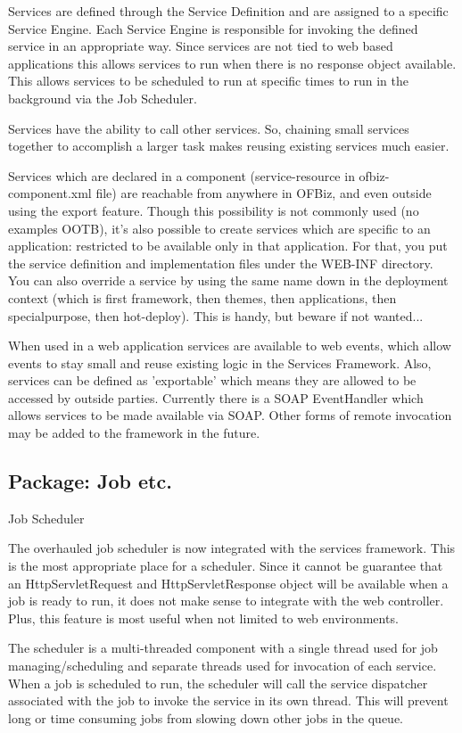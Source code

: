 \documentclass[english]{article}
\begin{document}
Services are defined through the Service Definition and are assigned to a specific Service Engine. Each Service Engine is responsible for invoking the defined service in an appropriate way. Since services are not tied to web based applications this allows services to run when there is no response object available. This allows services to be scheduled to run at specific times to run in the background via the Job Scheduler.

Services have the ability to call other services. So, chaining small services together to accomplish a larger task makes reusing existing services much easier.

Services which are declared in a component (service-resource in ofbiz-component.xml file) are reachable from anywhere in OFBiz, and even outside using the export feature. Though this possibility is not commonly used (no examples OOTB), it's also possible to create services which are specific to an application: restricted to be available only in that application. For that, you put the service definition and implementation files under the WEB-INF directory. You can also override a service by using the same name down in the deployment context (which is first framework, then themes, then applications, then specialpurpose, then hot-deploy). This is handy, but beware if not wanted...

When used in a web application services are available to web events, which allow events to stay small and reuse existing logic in the Services Framework. Also, services can be defined as 'exportable' which means they are allowed to be accessed by outside parties. Currently there is a SOAP EventHandler which allows services to be made available via SOAP. Other forms of remote invocation may be added to the framework in the future.

\subsection{Package: Job etc.}
Job Scheduler

The overhauled job scheduler is now integrated with the services framework. This is the most appropriate place for a scheduler. Since it cannot be guarantee that an HttpServletRequest and HttpServletResponse object will be available when a job is ready to run, it does not make sense to integrate with the web controller. Plus, this feature is most useful when not limited to web environments.

The scheduler is a multi-threaded component with a single thread used for job managing/scheduling and separate threads used for invocation of each service. When a job is scheduled to run, the scheduler will call the service dispatcher associated with the job to invoke the service in its own thread. This will prevent long or time consuming jobs from slowing down other jobs in the queue.
\end{document}
